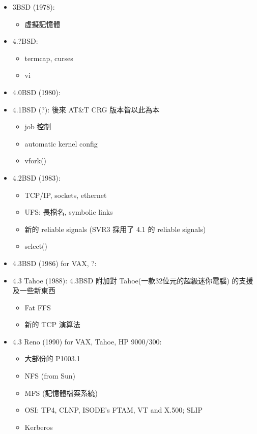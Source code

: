 \documentclass{article}
\begin{document}
\begin{CJK*}{Bg5}{ming}
\begin{itemize}
         \item 3BSD (1978):
	   \begin{itemize}
           \item 虛擬記憶體
	   \end{itemize}

         \item 4.?BSD:
	   \begin{itemize}
           \item termcap, curses
           \item vi
	   \end{itemize}

         \item 4.0BSD (1980):

         \item 4.1BSD (?): 後來 AT\&T CRG 版本皆以此為本
	   \begin{itemize}
           \item job 控制
           \item automatic kernel config
           \item vfork()
	   \end{itemize}

         \item 4.2BSD (1983):
	   \begin{itemize}
           \item TCP/IP, sockets, ethernet
           \item UFS: 長檔名, symbolic links
           \item 新的 reliable signals (SVR3 採用了 4.1 的 reliable signals)
           \item select()
	   \end{itemize}

         \item 4.3BSD (1986) for VAX, ?:
         \item 4.3 Tahoe (1988): 4.3BSD 附加對 Tahoe(一款32位元的超級迷你電腦)
           的支援及一些新東西
	   \begin{itemize}
           \item Fat FFS
           \item 新的 TCP 演算法
	   \end{itemize}
         \item 4.3 Reno (1990) for VAX, Tahoe, HP 9000/300:
	   \begin{itemize}
           \item 大部份的 P1003.1
           \item NFS (from Sun)
           \item MFS (記憶體檔案系統)
           \item OSI: TP4, CLNP, ISODE's FTAM, VT and X.500;  SLIP
           \item Kerberos
	   \end{itemize}


\end{itemize}
\end{CJK*}
\end{document}
